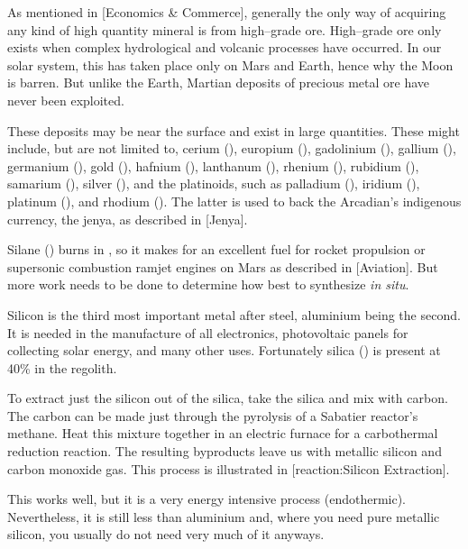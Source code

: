 As mentioned in [Economics & Commerce], generally the only way of acquiring any kind of high quantity mineral is from high--grade ore. High--grade ore only exists when complex hydrological and volcanic processes have occurred. In our solar system, this has taken place only on Mars and Earth, hence why the Moon is barren. But unlike the Earth, Martian deposits of precious metal ore have never been exploited.

These deposits may be near the surface and exist in large quantities. These might include, but are not limited to, cerium (), europium (), gadolinium (), gallium (), germanium (), gold (), hafnium (), lanthanum (), rhenium (), rubidium (), samarium (), silver (), and the platinoids, such as palladium (), iridium (), platinum (), and rhodium (). The latter is used to back the Arcadian's indigenous currency, the jenya, as described in [Jenya].

Silane () burns in , so it makes for an excellent fuel for rocket propulsion or supersonic combustion ramjet engines on Mars as described in [Aviation]. But more work needs to be done to determine how best to synthesize {\it in situ}.

Silicon is the third most important metal after steel, aluminium being the second. It is needed in the manufacture of all electronics, photovoltaic panels for collecting solar energy, and many other uses. Fortunately silica () is present at 40\% in the regolith.

To extract just the silicon out of the silica, take the silica and mix with carbon. The carbon can be made just through the pyrolysis of a Sabatier reactor's methane. Heat this mixture together in an electric furnace for a carbothermal reduction reaction. The resulting byproducts leave us with metallic silicon and carbon monoxide gas. This process is illustrated in [reaction:Silicon Extraction]. 

\startformula
{}
\stopformula

This works well, but it is a very energy intensive process (endothermic). Nevertheless, it is still less than aluminium and, where you need pure metallic silicon, you usually do not need very much of it anyways. 


